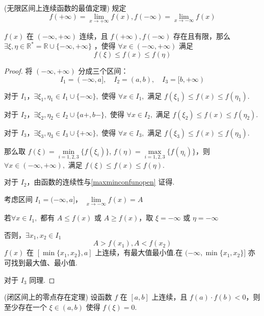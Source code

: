 \begin{corollary}(无限区间上连续函数的最值定理)
	规定 $$f(+\infty)=\lim\limits _{x \rightarrow+\infty} f(x), f(-\infty)=\lim\limits _{x \rightarrow-\infty} f(x)$$  
	
	$f(x)$ 在 $(-\infty,+\infty)$ 连续，且 $f(+\infty), f(-\infty)$ 存在且有限，那么 $\exists \xi, \eta \in \mathbb{R}^*=\mathbb{R} \cup\{-\infty,+\infty\}$ ，使得 $\forall x \in(-\infty,+\infty)$ 满足 $$f(\xi) \leqslant f(x) \leqslant f(\eta)$$
\end{corollary}
\begin{proof}
	将 \((-\infty, +\infty)\) 分成三个区间：
	\[ I_1 = (-\infty, a], \quad I_2 = (a, b), \quad I_3 = [b, +\infty) \]
	
	对于 \(I_1\)，\(\exists \xi_1, \eta_1 \in I_1 \cup \{-\infty\}, \) 使得 \(\forall x \in I_1, \) 满足 \( f(\xi_1) \leqslant f(x) \leqslant f(\eta_1) \).
	
	对于 \(I_2\)，\(\exists \xi_2, \eta_2 \in I_2 \cup \{a+, b-\}, \) 使得 \(\forall x \in I_2, \) 满足 \( f(\xi_2) \leqslant f(x) \leqslant f(\eta_2) \).
	
	对于 \(I_3\)，\(\exists \xi_3, \eta_3 \in I_3 \cup \{+\infty\}, \) 使得 \(\forall x \in I_3, \) 满足 \( f(\xi_3) \leqslant f(x) \leqslant f(\eta_3) \).
	
	那么取 \( f(\xi) = \min\limits_{i=1,2,3} \{f(\xi_i)\} \), \( f(\eta) = \max\limits_{i=1,2,3} \{f(\eta_i)\} \)，则 \(\forall x \in (-\infty, +\infty), \) 满足 \( f(\xi) \leqslant f(x) \leqslant f(\eta) \).
	
	对于 \(I_2\)，由函数的连续性与\ref{maxminconfunopen} 证得.
	
	考虑区间 \( I_1 = (-\infty, a] \)， \(\lim\limits_{x \to -\infty} f(x) = A\)
	
	若\(\forall x \in I_1, \) 都有 \( A \leqslant f(x) \) 或 \( A \geqslant f(x) \)，取 \(\xi = -\infty\) 或 \(\eta = -\infty\)
	
	否则，$\exists x_1,x_2\in I_1$\[A>f(x_1),A<f(x_2)\]
	\(f(x)\) 在 \([ \min\{x_1, x_2\}, a ]\) 上连续，有最大值最小值.在 \((-\infty, \min\{x_1, x_2\}]\) 亦可找到最大值、最小值.
	
	对于 \(I_3\) 同理.
\end{proof}
\begin{proposition}(闭区间上的零点存在定理)
	设函数 \( f \) 在 \([a, b]\) 上连续，且 \( f(a) \cdot f(b) < 0 \)，则至少存在一个 \(\xi \in (a, b)\) 使得 \( f(\xi) = 0 \).
	\label{闭区间上的零点存在定理}
	
\end{proposition}
